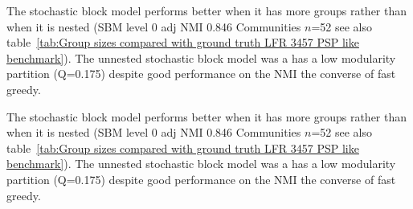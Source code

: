 The stochastic block model performs better when it has more groups rather than when it is nested (SBM level 0 adj NMI 0.846 Communities $n$=52 see also table~\ref{tab:Group sizes compared with ground truth LFR 3457 PSP like benchmark}). The unnested stochastic block model was a has a low modularity partition (Q=0.175) despite good performance on the NMI the converse of fast greedy.
 
 
 The stochastic block model performs better when it has more groups rather than when it is nested (SBM level 0 adj NMI 0.846 Communities $n$=52 see also table~\ref{tab:Group sizes compared with ground truth LFR 3457 PSP like benchmark}). The unnested stochastic block model was a has a low modularity partition (Q=0.175) despite good performance on the NMI the converse of fast greedy.
